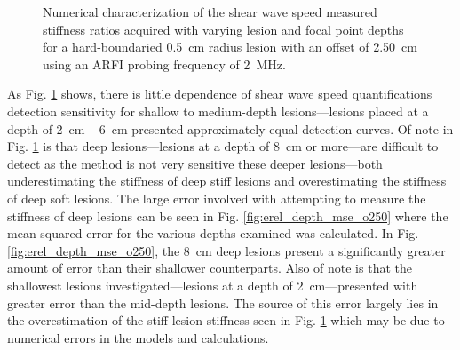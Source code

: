 			\begin{figure}[!htb]
				\centering
				\caption[Numerical characterization of shear wave speed measured stiffness ratio with changing lesion depth]{Numerical characterization of the shear wave speed measured stiffness ratios acquired with varying lesion and focal point depths for a hard-boundaried \SI{0.5}{cm} radius lesion with an offset of \SI{2.50}{\cm} using an ARFI probing frequency of \SI{2}{\MHz}.}
				\label{fig:erel_depth_o250}
			\end{figure}

			As Fig. \ref{fig:erel_depth_o250} shows, there is little dependence of shear wave speed quantifications detection sensitivity for shallow to medium-depth lesions---lesions placed at a depth of \SI{2}{\cm} -- \SI{6}{\cm} presented approximately equal detection curves. Of note in Fig. \ref{fig:erel_depth_o250} is that deep lesions---lesions at a depth of \SI{8}{\cm} or more---are difficult to detect as the method is not very sensitive these deeper lesions---both underestimating the stiffness of deep stiff lesions and overestimating the stiffness of deep soft lesions. The large error involved with attempting to measure the stiffness of deep lesions can be seen in Fig. \ref{fig:erel_depth_mse_o250} where the mean squared error for the various depths examined was calculated. In Fig. \ref{fig:erel_depth_mse_o250}, the \SI{8}{\cm} deep lesions present a significantly greater amount of error than their shallower counterparts. Also of note is that the shallowest lesions investigated---lesions at a depth of \SI{2}{\cm}---presented with greater error than the mid-depth lesions. The source of this error largely lies in the overestimation of the stiff lesion stiffness seen in Fig. \ref{fig:erel_depth_o250} which may be due to numerical errors in the models and calculations.

